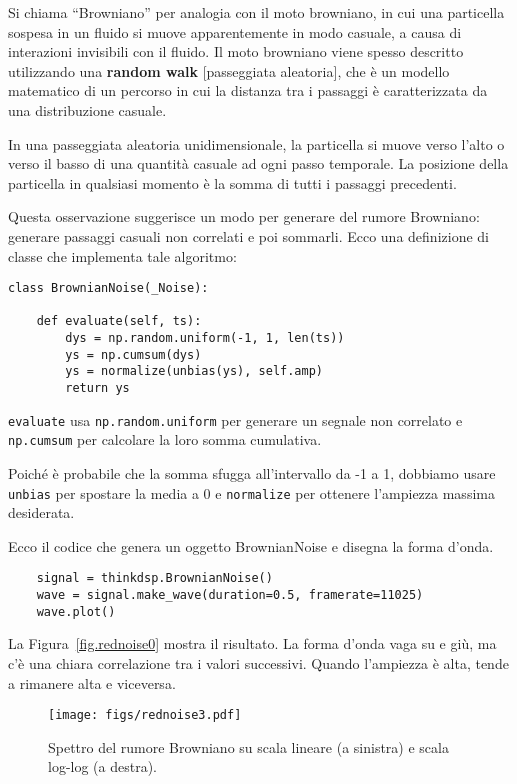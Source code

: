 \documentclass[12pt,a4paper]{book}
\begin{document}
Si chiama ``Browniano'' per analogia con il moto browniano, in cui una particella sospesa in un fluido si muove apparentemente in modo casuale, a causa di interazioni invisibili con il fluido. Il moto browniano viene spesso descritto utilizzando una {\bf random walk} [passeggiata aleatoria], che è un modello matematico di un percorso in cui la distanza tra i passaggi è caratterizzata da una distribuzione casuale.

In una passeggiata aleatoria unidimensionale, la particella si muove verso l'alto o verso il basso di una quantità casuale ad ogni passo temporale. La posizione della particella in qualsiasi momento è la somma di tutti i passaggi precedenti.

Questa osservazione suggerisce un modo per generare del rumore Browniano: generare passaggi casuali non correlati e poi sommarli. Ecco una definizione di classe che implementa tale algoritmo:

\begin{verbatim} 
class BrownianNoise(_Noise):

    def evaluate(self, ts):
        dys = np.random.uniform(-1, 1, len(ts))
        ys = np.cumsum(dys)
        ys = normalize(unbias(ys), self.amp)
        return ys
 \end{verbatim} 

{\tt evaluate} usa {\tt np.random.uniform} per generare un segnale non correlato e {\tt np.cumsum} per calcolare la loro somma cumulativa.

Poiché è probabile che la somma sfugga all'intervallo da -1 a 1, dobbiamo usare {\tt unbias} per spostare la media a 0 e {\tt normalize} per ottenere l'ampiezza massima desiderata.

Ecco il codice che genera un oggetto BrownianNoise e disegna la forma d'onda.

\begin{verbatim} 
    signal = thinkdsp.BrownianNoise()
    wave = signal.make_wave(duration=0.5, framerate=11025)
    wave.plot()
 \end{verbatim} 

La Figura~\ref{fig.rednoise0} mostra il risultato. La forma d'onda vaga su e giù, ma c'è una chiara correlazione tra i valori successivi. Quando l'ampiezza è alta, tende a rimanere alta e viceversa.

\begin{figure} 

\centerline{\texttt{[image: figs/rednoise3.pdf]}} \caption{Spettro del rumore Browniano su scala lineare (a sinistra) e scala log-log (a destra).} \label{fig.rednoise3} \end{figure} 
\end{document}
